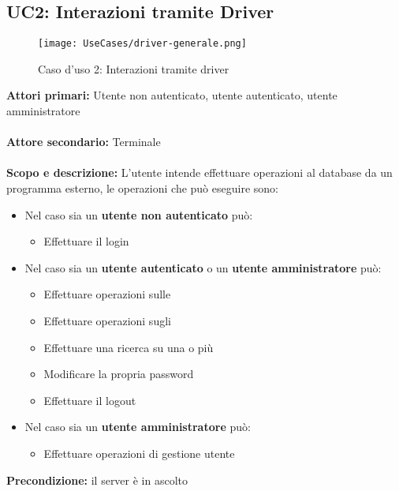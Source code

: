 \documentclass{scalatekids-article}
\begin{document}
\subsection{UC2: Interazioni tramite Driver}
\begin{figure}[H]
  \begin{center}
    \texttt{[image: UseCases/driver-generale.png]}
    \caption*{Caso d'uso 2: Interazioni tramite driver}
  \end{center}
\end{figure}
\textbf{Attori primari:} Utente non autenticato, utente autenticato, utente amministratore\\ \\
\textbf{Attore secondario:} Terminale\\ \\
\textbf{Scopo e descrizione:} L'utente intende effettuare operazioni al database da un programma  esterno, le operazioni che può eseguire sono:
\begin{itemize}
  \item Nel caso sia un \textbf{utente non autenticato} può:
  \begin{itemize}
    \item Effettuare il login
  \end{itemize}
  \item Nel caso sia un \textbf{utente autenticato} o un \textbf{utente amministratore} può:
  \begin{itemize}
    \item Effettuare operazioni sulle 
    \item Effettuare operazioni sugli 
    \item Effettuare una ricerca su una o più 
    \item Modificare la propria password
    \item Effettuare il logout
  \end{itemize}
  \item Nel caso sia un \textbf{utente amministratore} può:
  \begin{itemize}
    \item Effettuare operazioni di gestione utente
  \end{itemize}
\end{itemize}
\textbf{Precondizione:} il server è in ascolto\\ \\
\end{document}
